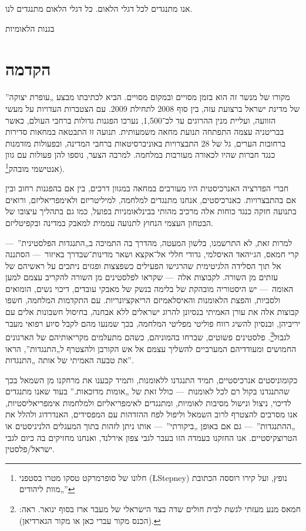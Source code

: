 אנו מתנגדים לכל דגלי הלאום.
כל דגלי הלאום מתנגדים לנו.

בגנות הלאומיות

\section*{הקדמה}

מקורו של מנשר זה הוא בזמן מסויים ובמקום מסויים. הביא לכתיבתו מבצע „עופרת יצוקה” של מדינת ישראל ברצועת עזה, בין סוף 2008 לתחילת  2009. עם הצטברות העדויות על מעשי הזוועה, ועליית מנין ההרוגים עד לכ־1,500, נערכו הפגנות גדולות ברחבי העולם, כאשר בבריטניה עצמה התפתחה תנועת מחאה משמעותית. תנועה זו התבטאה במחאות סדירות ברחובות הערים, גל של 28 התבצרויות באוניברסיטאות ברחבי המדינה, ובפעולות מזדמנות כנגד חברות שהיו לכאורה מעורבות במלחמה. למרבה הצער, נוספו להן פעולות עם גוון אנטישמי מובהק\footnote{חלונו של סופרמרקט טסקו מטרו בסטפני (\L{Stepney}) נופץ, ועל קירו רוססה הכתובת „מוות ליהודים”}).

חברי הפדרציה האנרכיסטית היו מעורבים במחאה במגוון דרכים, בין אם בהפגנות רחוב ובין אם בהתבצרויות. כאנרכיסטים, אנחנו מתנגדים למלחמה, למיליטריזם ולאימפריאליזם, ורואים בתנועה חזקה כנגד כוחות אלה מרכיב מהותי בבינלאומניות בפועל, כמו גם בתהליך עיצובו של הבטחון העצמי הנחוץ לתנועה עממית למאבק במדינה ובקפיטליזם.

למרות זאת, לא התרשמנו, בלשון המעטה, מהדרך בה התמיכה ב„התנגדות הפלסטינית”~— קרי חמאס, הג׳יהאד האיסלמי, גדודי חללי אל־אקצא ושאר מדינות־שבדרך באיזור~— הסתננה אל תוך הסלידה הלגיטימית שהרגישו הפעילים כשפצצות ופגזים ניתכים על ראשיהם של עזתים מן השורה. לקבוצות אלה~— שקראו לפלסטינים מן השורה להקריב עצמם למען האומה~— יש היסטוריה מובהקת של בלימה בנשק של מאבקי עובדים, דיכוי נשים, הומואים ולסביות, והפצת הלאומנות והאיסלאמיזם הריאקציונריות. עם התקדמות המלחמה, חשפו קבוצות אלה את עורן האמיתי בנסיונן להרוג ישראלים ללא אבחנה, בחיסול חשבונות אלים עם יריביהן, ובנסיון להשיג רווח פוליטי מפליטי המלחמה, בכך שמנעו מהם לקבל סיוע רפואי מעבר לגבול\footnote{חמאס מנע מעזתי לגשת לבית חולים שדה בצד הישראלי של מעבר ארז בסוף ינואר. ראה: (הכנס מקור עברי כאן או מקור הגארדיאן).}. פלסטינים פשוטים, שברחו בהמוניהם, כשהם מתעלמים מקריאותיהם של הארגונים החמושים ומעודדיהם המערביים להשליך עצמם אל אש הקורבן ולהצטרף ל„התנגדות”, הראו את טבעה האמיתי של אותה „התנגדות”.

כקומוניסטים אנרכיסטיים, תמיד התנגדנו ללאומנות, ותמיד קבענו את מרחקנו מן השמאל בכך שהתנגדנו בקול רם  לכל לאומנות~— כולל זאת של „אומות מדוכאות.” בעוד שאנו מתנגדים לדיכוי, ניצול ונישול מסיבות לאומיות, ומתנגדים לאימפריאליזם ולמלחמות אימפריאליסטיות, אנו מסרבים להצטרף לרוב השמאל וליפול לפח ההזדהות עם המפסידים, האנדרדוג ולהלל את „ההתנגדות”~— גם אם באופן „ביקורתי”~— אותו ניתן לזהות בתוך המעגלים הלניניסטים או הטרוצקיסטיים. אנו החזקנו בעמדה הזו בעבר לגבי צפון אירלנד, ואנחנו מחזיקים בה כיום לגבי ישראל/פלסטין.

